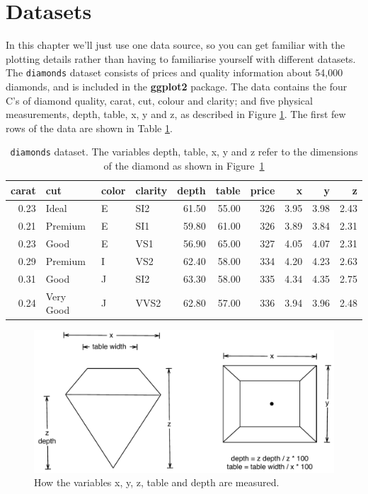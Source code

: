 \section{Datasets}\label{sec:data-sets}

In this chapter we'll just use one data source, so you can get familiar
with the plotting details rather than having to familiarise yourself
with different datasets. The \texttt{diamonds} dataset consists of
prices and quality information about 54,000 diamonds, and is included in
the \textbf{ggplot2} package. The data contains the four C's of diamond
quality, carat, cut, colour and clarity; and five physical measurements,
depth, table, x, y and z, as described in Figure \ref{fig:diamond-dim}.
The first few rows of the data are shown in Table \ref{tbl:diamonds}.

\begin{table}[ht]
\centering
\begin{tabular}{rlllrrrrrr}
  \hline
carat & cut & color & clarity & depth & table & price & x & y & z \\ 
  \hline
0.23 & Ideal & E & SI2 & 61.50 & 55.00 & 326 & 3.95 & 3.98 & 2.43 \\ 
  0.21 & Premium & E & SI1 & 59.80 & 61.00 & 326 & 3.89 & 3.84 & 2.31 \\ 
  0.23 & Good & E & VS1 & 56.90 & 65.00 & 327 & 4.05 & 4.07 & 2.31 \\ 
  0.29 & Premium & I & VS2 & 62.40 & 58.00 & 334 & 4.20 & 4.23 & 2.63 \\ 
  0.31 & Good & J & SI2 & 63.30 & 58.00 & 335 & 4.34 & 4.35 & 2.75 \\ 
  0.24 & Very Good & J & VVS2 & 62.80 & 57.00 & 336 & 3.94 & 3.96 & 2.48 \\ 
   \hline
\end{tabular}
\caption{\texttt{diamonds} dataset.  The variables depth, table, x, y and z refer to the dimensions of the diamond as shown in Figure~\ref{fig:diamond-dim}} 
\label{tbl:diamonds}
\end{table}

\begin{figure}[htbp]
  \centering
    \includegraphics[width=0.8\linewidth]{diagrams/diamond-dimensions}
  \caption{How the variables x, y, z, table and depth are measured.}
  \label{fig:diamond-dim}
\end{figure}

